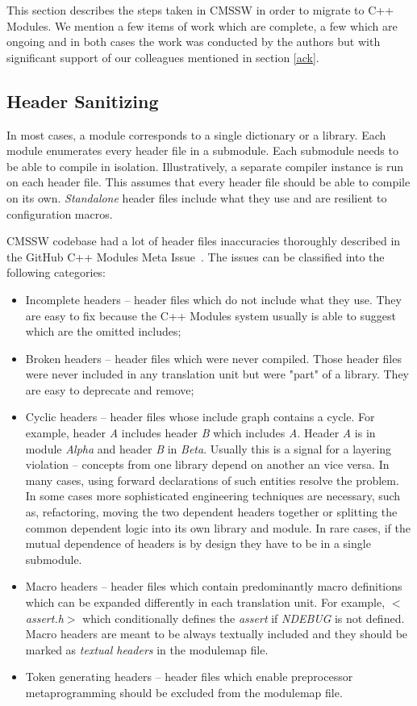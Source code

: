 \documentclass[12pt]{iopart}
\begin{document}
This section describes the steps taken in CMSSW in order to migrate to C++ Modules. We mention a few items of work which are complete, a few which are ongoing and in both cases the work was conducted by the authors but with significant support of our colleagues mentioned in section \ref{ack}.

\subsection{Header Sanitizing}
In most cases, a module corresponds to a single dictionary or a library. Each module enumerates every header file in a submodule. Each submodule needs to be able to compile in isolation. Illustratively, a separate compiler instance is run on each header file. This assumes that every header file should be able to compile on its own. \textit{Standalone} header files include what they use and are resilient to configuration macros.

CMSSW codebase had a lot of header files inaccuracies thoroughly described in the GitHub C++ Modules Meta Issue~\cite{Modules-gh-metaissue}. The issues can be classified into the following categories:
\begin{itemize}
    \item Incomplete headers -- header files which do not include what they use. They are easy to fix because the C++ Modules system usually is able to suggest which are the omitted includes;
    \item Broken headers -- header files which were never compiled. Those header files were never included in any translation unit but were "part" of a library. They are easy to deprecate and remove;
    \item Cyclic headers -- header files whose include graph contains a cycle. For example, header \textit{A} includes header \textit{B} which includes \textit{A}. Header \textit{A} is in module \textit{Alpha} and header \textit{B} in \textit{Beta}. Usually this is a signal for a layering violation -- concepts from one library depend on another an vice versa. In many cases, using forward declarations of such entities resolve the problem. In some cases more sophisticated engineering techniques are necessary, such as, refactoring, moving the two dependent headers together or splitting the common dependent logic into its own library and module. In rare cases, if the mutual dependence of headers is by design they have to be in a single submodule.
    \item Macro headers -- header files which contain predominantly macro definitions which can be expanded differently in each translation unit. For example, \textit{$<$assert.h$>$} which conditionally defines the \textit{assert} if \textit{NDEBUG} is not defined. Macro headers are meant to be always textually included and they should be marked as \textit{textual headers} in the modulemap file. 
    \item Token generating headers -- header files which enable preprocessor metaprogramming should be excluded from the modulemap file.
\end{itemize}
\end{document}
